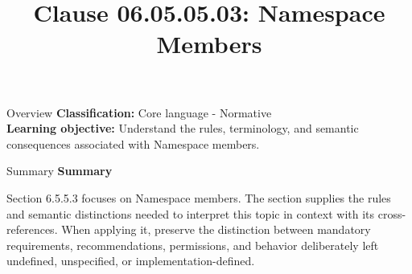 \documentclass[10pt,letterpaper]{article}
\title{Clause 06.05.05.03: Namespace Members}
\author{}
\date{}
\begin{document}
\maketitle
\begin{CornellOverviewBox}{Overview}
\textbf{Classification:} Core language - Normative\\[2pt]
\textbf{Learning objective:} Understand the rules, terminology, and semantic consequences associated with Namespace members.
\end{CornellOverviewBox}\begin{CornellSummaryBox}{Summary}
{\sffamily\bfseries\color{Accent} Summary}\par\vspace{3pt}Section 6.5.5.3 focuses on Namespace members. The section supplies the rules and semantic distinctions needed to interpret this topic in context with its cross-references. When applying it, preserve the distinction between mandatory requirements, recommendations, permissions, and behavior deliberately left undefined, unspecified, or implementation-defined.
\end{CornellSummaryBox}
\end{document}
